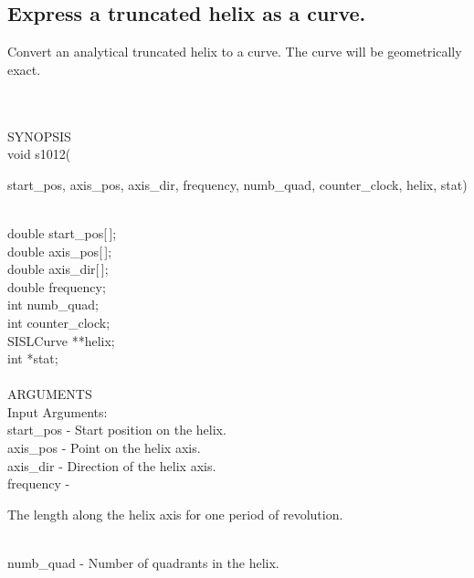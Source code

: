 \subsection{Express a truncated helix as a curve.}
\begin{minipg1}
  Convert an analytical truncated helix to a curve.
  The curve will be geometrically exact.
\end{minipg1}\\ \\
SYNOPSIS\\
        \>void s1012(\begin{minipg3}
          {\fov start\_pos}, {\fov axis\_pos}, {\fov axis\_dir}, {\fov frequency}, {\fov numb\_quad},
          {\fov counter\_clock}, {\fov helix}, {\fov stat})
        \end{minipg3}\\[0.3ex]
        \>\>    double \> {\fov start\_pos}[\,];\\
        \>\>    double \> {\fov axis\_pos}[\,];\\
        \>\>    double \> {\fov axis\_dir}[\,];\\
        \>\>    double \> {\fov frequency};\\
        \>\>    int    \> {\fov numb\_quad};\\
        \>\>    int    \> {\fov counter\_clock};\\
        \>\>    SISLCurve \> **{\fov helix};\\
        \>\>    int    \> *{\fov stat};\\
\\
ARGUMENTS\\
        \>Input Arguments:\\
        \>\>    {\fov start\_pos} \> - \> Start position on the helix.\\
        \>\>    {\fov axis\_pos}  \> - \> Point on the helix axis.\\
        \>\>    {\fov axis\_dir}  \> - \> Direction of the helix axis.\\
        \>\>    {\fov frequency}  \> - \> \begin{minipg2}
                                            The length along the helix
                                            axis for one period of revolution.
                                          \end{minipg2}\\[0.8ex]
        \>\>    {\fov numb\_quad} \> - \> Number of quadrants in the helix.\\
